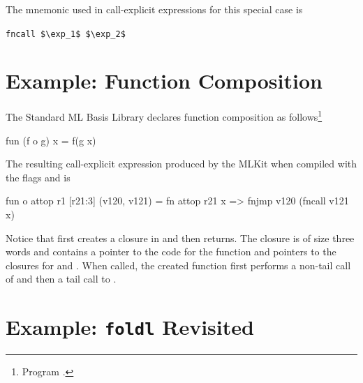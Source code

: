 \documentclass[12pt]{book}
\begin{document}
The mnemonic used in call-explicit expressions for this special case is
\begin{center}
  \lstinline!fncall $\exp_1$ $\exp_2$!
\end{center}

\section{Example: Function Composition}

The Standard ML Basis Library declares function composition as
follows\footnote{Program .}
\begin{smlcode}
  fun (f o g) x = f(g x)
\end{smlcode}
The resulting call-explicit expression produced by the MLKit when compiled with
the flags  and  is
\begin{smlcode}
  fun o attop r1 [r21:3] (v120, v121) =
      fn attop r21 x => fnjmp v120 (fncall v121 x)
\end{smlcode}
Notice that
%
%
%
 first creates a closure in  and then returns.  The
closure is of size three words and contains a pointer to the code for the
function and pointers to the closures for  and . When called, the
created function first performs a non-tail call of  and then a tail call
to .

\section{Example: \texttt{foldl} Revisited}
\label{foldl.sec}
\end{document}
